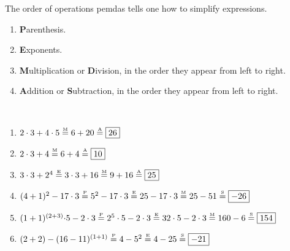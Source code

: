 \documentclass[crop=false,class=article,oneside]{standalone}
\begin{document}
        The order of operations \gls{pemdas} tells one
        how to simplify expressions.
        \begin{enumerate}
            \label{North_Shore_PEMDAS}
            \item \textbf{P}arenthesis.
            \item \textbf{E}xponents.
            \item \textbf{M}ultiplication or \textbf{D}ivision, 
                in the order they appear from left to right.
            \item \textbf{A}ddition or \textbf{S}ubtraction,
                in the order they appear from left to right.
        \end{enumerate}
        \begin{example}
            \
            \begin{enumerate}
                \item ${2}\cdot{3}+{4}\cdot{5}%
                       \overset{\textrm{\tiny{M}}}{=}%
                       6+20\overset{\textrm{\tiny{A}}}{=}%
                       \boxed{26}$
                \item ${2}\cdot{3}%
                       +4\overset{\textrm{\tiny{M}}}{=}%
                       6+4\overset{\textrm{\tiny{A}}}{=}%
                       \boxed{10}$
                \item ${3}\cdot{3+2^{4}}%
                       \overset{\textrm{\tiny{E}}}{=}%
                       {3}\cdot {3}+16%
                       \overset{\textrm{\tiny{M}}}{=}%
                       9+16\overset{\textrm{\tiny{A}}}{=}%
                       \boxed{25}$
                \item $(4+1)^2-17\cdot 3%
                    \overset{\textrm{\tiny{P}}}{=}%
                    5^{2}-17\cdot 3%
                    \overset{\textrm{\tiny{E}}}{=}25-17\cdot 3%
                    \overset{\textrm{\tiny{M}}}{=}25-51%
                    \overset{\textrm{\tiny{S}}}{=}\boxed{-26}$
                \item ${(1+1)^{(2+3)}\cdot}{5}-%
                       {2}\cdot{3}
                       \overset{\textrm{\tiny{P}}}{=}%
                       {2^{5}}\cdot{5}-{2}\cdot{3}%
                       \overset{\textrm{\tiny{E}}}{=}%
                       {32}\cdot{5}-{2}\cdot{3}%
                       \overset{\textrm{\tiny{M}}}{=}%
                       160-6\overset{\textrm{\tiny{S}}}{=}%
                       \boxed{154}$
                \item $(2+2)-(16-11)^{(1+1)}%
                       \overset{\textrm{\tiny{P}}}{=}4-5^{2}%
                       \overset{\textrm{\tiny{E}}}{=}4-25%
                       \overset{\textrm{\tiny{S}}}{=}%
                       \boxed{-21}$
            \end{enumerate}
        \end{example}
\end{document}
